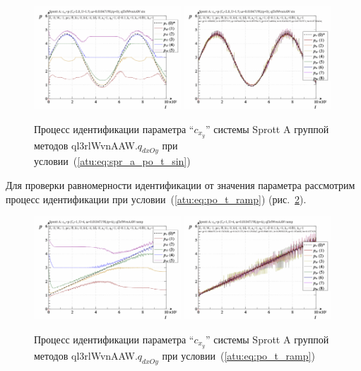 \begin{figure}[htb!]
  \centerline{
    \includegraphics[width=0.49\textwidth]{p/cha/spr_a/ql3rlWvnAAW_dxOy/sprott_a_id2-p_t_pi_ql3rlWvnAAW_sin.png}
    \hfill
    \includegraphics[width=0.49\textwidth]{p/cha/spr_a/ql3rlWvnAAW_dxOy/sprott_a_id2-p_t_p_ql3rlWvnAAW_sin.png}
  }
  \caption{Процесс идентификации параметра ``$c_{x_y}$'' системы Sprott A группой методов ql3rlWvnAAW.$q_{dxOy}$ при условии~(\ref{atu:eq:spr_a_po_t_sin})}
  \label{atu:f:spr_a_id_ql3rlWvnAAW_q_dxOy_sin}
\end{figure}

Для проверки равномерности идентификации от значения параметра
рассмотрим процесс идентификации при условии~(\ref{atu:eq:po_t_ramp})
(рис.~\ref{atu:f:spr_a_id_ql3rlWvnAAW_q_dxOy_ramp}).

\begin{figure}[htb!]
  \centerline{
    \includegraphics[width=0.49\textwidth]{p/cha/spr_a/ql3rlWvnAAW_dxOy/sprott_a_id2-p_t_pi_ql3rlWvnAAW_ramp.png}
    \hfill
    \includegraphics[width=0.49\textwidth]{p/cha/spr_a/ql3rlWvnAAW_dxOy/sprott_a_id2-p_t_p_ql3rlWvnAAW_ramp.png}
  }
  \caption{Процесс идентификации параметра ``$c_{x_y}$'' системы Sprott A группой методов ql3rlWvnAAW.$q_{dxOy}$ при условии~(\ref{atu:eq:po_t_ramp})}
  \label{atu:f:spr_a_id_ql3rlWvnAAW_q_dxOy_ramp}
\end{figure}

